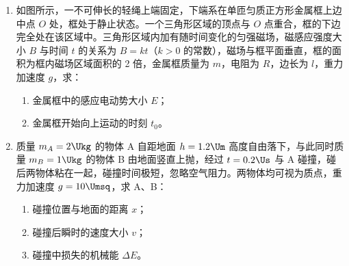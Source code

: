 \documentclass[\gkver]{gaokaozhenti}
\begin{document}
\begin{enumerate}
{（6）A．电压表分流属于系统误差，故 A 正确；

B．为保护电路，实验开始前滑动变阻器滑片应该调到 $a$ 端，使电压表示数为零，故 B 错误；

C．如图所示的电路为分压式电路，可以通过调节滑片使电压表示数为 $0$，即滑动变阻器滑片调到 $a$ 端，电压表示数为零，故 C 正确；

D．通过测量多组数据绘制 $U-I$ 图像可减小偶然误差，故 D 错误。

故选 AC。
}

\item
如图所示，一不可伸长的轻绳上端固定，下端系在单匝匀质正方形金属框上边中点 $O$ 处，框处于静止状态。一个三角形区域的顶点与 $O$ 点重合，框的下边完全处在该区域中。三角形区域内加有随时间变化的匀强磁场，磁感应强度大小 $B$ 与时间 $t$ 的关系为 $B = kt$（$k > 0$ 的常数），磁场与框平面垂直，框的面积为框内磁场区域面积的 2 倍，金属框质量为 $m$，电阻为 $R$，边长为 $l$，重力加速度 $g$，求：
\begin{enumerate}
	\item
	金属框中的感应电动势大小 $E$；
	\item
	金属框开始向上运动的时刻 $t_{0}$。
\end{enumerate}

\onepicture[h=4.50cm, align=right]{}


\item
质量 $m_{A} = 2 \Ukg$ 的物体 A 自距地面 $h = 1.2 \Um$ 高度自由落下，与此同时质量 $m_{B} = 1 \Ukg$ 的物体 B 由地面竖直上抛，经过 $t = 0.2 \Us$ 与 A 碰撞，碰后两物体粘在一起，碰撞时间极短，忽略空气阻力。两物体均可视为质点，重力加速度 $g = 10 \Umsq$，求 A、B：
\begin{enumerate}
	\item
	碰撞位置与地面的距离 $x$；
	\item
	碰撞后瞬时的速度大小 $v$；
	\item
	碰撞中损失的机械能 $\Delta E$。
\end{enumerate}


\end{enumerate}
\end{document}

